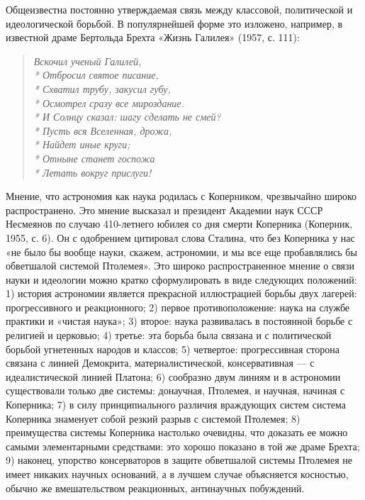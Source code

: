 Общеизвестна постоянно утверждаемая связь между классовой,
политической и идеологической борьбой. В популярнейшей форме это
изложено, например, в известной драме Бертольда Брехта «Жизнь Галилея»
(1957, с. 111):

\begin{verse}

    \emph{Вскочил ученый Галилей,\\*
    Отбросил святое писание,\\*
    Схватил трубу, закусил губу,\\*
    Осмотрел сразу все мироздание.\\*
    И Солнцу сказал: шагу сделать не смей?\\*
    Пусть вся Вселенная, дрожа,\\*
    Найдет иные круги;\\*
    Отныне станет госпожа\\*
    Летать вокруг прислуги!}

\end{verse}

Мнение, что астрономия как наука родилась с Коперником, чрезвычайно
широко распространено. Это мнение высказал и президент Академии наук
СССР Несмеянов по случаю 410-летнего юбилея со дня смерти Коперника
(Коперник, 1955, с. 6). Он с одобрением цитировал слова Сталина, что
без Коперника у нас «не было бы вообще науки, скажем, астрономии, и мы
все еще пробавлялись бы обветшалой системой Птолемея». Это широко
распространенное мнение о связи науки и идеологии можно кратко
сформулировать в виде следующих положений: 1) история астрономии
является прекрасной иллюстрацией борьбы двух лагерей: прогрессивного и
реакционного; 2) первое противоположение: наука на службе практики и
«чистая наука»; 3) второе: наука развивалась в постоянной борьбе с
религией и церковью; 4) третье: эта борьба была связана и с
политической борьбой угнетенных народов и классов; 5) четвертое:
прогрессивная сторона связана с линией Демокрита, материалистической,
консервативная --- с идеалистической линией Платона; 6) сообразно двум
линиям и в астрономии существовали только две системы: донаучная,
Птолемея, и научная, начиная с Коперника; 7) в силу принципиального
различия враждующих систем система Коперника знаменует собой резкий
разрыв с системой Птолемея; 8) преимущества системы Коперника
настолько очевидны, что доказать ее можно самыми элементарными
средствами: это хорошо показано в той же драме Брехта; 9) наконец,
упорство консерваторов в защите обветшалой системы Птолемея не имеет
никаких научных оснований, а в лучшем случае объясняется косностью,
обычно же вмешательством реакционных, антинаучных побуждений.

